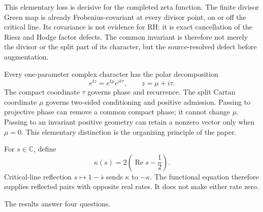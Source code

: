 \documentclass[11pt]{article}
\theoremstyle{definition}
\theoremstyle{remark}
\newcommand{\C}{\mathbb C}
\newcommand{\Rea}{\operatorname{Re}}
\begin{document}
This elementary loss is decisive for the completed zeta function.  The
finite divisor Green map is already Frobenius-covariant at every divisor
point, on or off the critical line.  Its covariance is not evidence for
RH: it is exact cancellation of the Riesz and Hodge factor defects.  The
common invariant is therefore not merely the divisor or the split part of
its character, but the source-resolved defect before augmentation.

Every one-parameter complex character has the polar decomposition
\[
 e^{tz}=e^{t\mu}e^{it\tau},\qquad z=\mu+i\tau.
\tag{1.1}\label{eq:character-polar}
\]
The compact coordinate \(\tau\) governs phase and recurrence.  The split
Cartan coordinate \(\mu\) governs two-sided conditioning and positive
admission.  Passing to projective phase can remove a common compact phase;
it cannot change \(\mu\).  Passing to an invariant positive geometry can
retain a nonzero vector only when \(\mu=0\).  This elementary distinction
is the organizing principle of the paper.

For \(s\in\C\), define
\[
                    \kappa(s)=2\left(\Rea s-\frac12\right).
\tag{1.2}\label{eq:kappa}
\]
Critical-line reflection \(s\mapsto1-\overline{s}\) sends
\(\kappa\) to \(-\kappa\).  The functional equation therefore supplies
reflected pairs with opposite real rates.  It does not make either rate
zero.

The results answer four questions.
\end{document}
